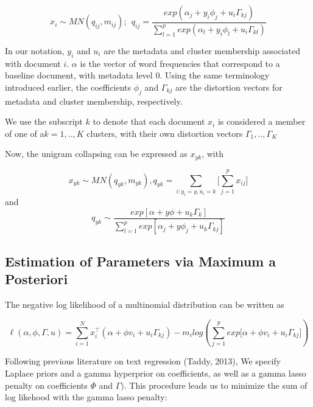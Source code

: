 \documentclass[12pt]{article}
\begin{document}
\begin{equation}
 x_{i} \sim MN(q_{ij},m_{ij})    ; ~~  q_{ij} = \frac{exp(\alpha_j + y_i \phi_j + u_i \Gamma_{kj})}{\sum_{l=1}^{p}{exp(\alpha_l+ y_i \phi_l + u_i \Gamma_{kl})}}
\end{equation} 


In our notation, $y_i$ and $u_i$ are the metadata and cluster membership associated
with document $i$. $\alpha$ is the vector of word frequencies that correspond to a baseline document, with metadata level 0. 
Using the same terminology introduced earlier, the coefficients $\phi_j$ and $\Gamma_{kj}$ are the distortion
vectors for metadata and cluster membership, respectively.

 We use
the subscript $k$ to denote that each document $x_i$ is considered a
member of one of a$k = 1,..,K$ clusters, with their own distortion vectors
$\Gamma_1,..,\Gamma_K$

Now, the unigram collapsing can be expressed as $x_{yk}$, with

\begin{equation}
 x_{yk} \sim MN(q_{yk},m_{yk}), q_{yk} = \sum\limits_{i: y_i = y, u_i = k} \big[\sum_{j = 1}^{p} {x_{ij}} \big]
\end{equation}
and 
\begin{equation}
q_{yk} \sim \frac{exp[\alpha + y \phi  + u_k \Gamma_{k}]}{\sum_{l=1}^{p} exp[\alpha_j + y \phi_j+ u_k \Gamma_{kj} ]}
\end{equation}

\subsection{Estimation of Parameters via Maximum a
Posteriori}\label{estimation-of-parameters-via-maximum-a-posteriori}

The negative log likelihood of a multinomial distribution can be written
as

\begin{equation} 
\ell(\alpha,\phi,\Gamma,u) = \sum_{i = 1}^{N}{ x_i^\top (\alpha + \phi v_i + u_i \Gamma_{kj})} - m_i log(\sum_{j = 1}^{p}{exp{\big[ \alpha + \phi v_i + u_i \Gamma_{kj} \big]}})
\end{equation}

Following previous literature on text regression (Taddy, 2013), We specify Laplace priors and a gamma hyperprior on coefficients, as well as a gamma lasso penalty on coefficients $\Phi$ and $\Gamma)$. This
procedure leads us to minimize the sum of log likehood with the gamma lasso penalty:
\end{document}
